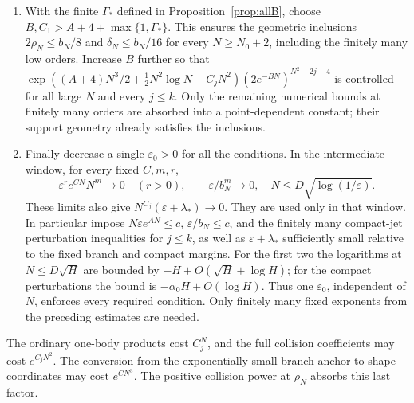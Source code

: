 \documentclass[11pt]{article}
\numberwithin{equation}{section}
\theoremstyle{definition}
\newcommand{\eps}{\varepsilon}
\begin{document}
\begin{enumerate}
the still unselected exponent \(B\).
\item With the finite \(\Gamma_*\) defined in
Proposition~\ref{prop:allB}, choose
\(B,C_1>A+4+\max\{1,\Gamma_*\}\). This ensures the geometric
inclusions \(2\rho_N\le b_N/8\) and \(\delta_N\le b_N/16\)
for every \(N\ge N_0+2\), including the finitely many low orders.
Increase \(B\) further so that
\(\exp((A+4)N^3/2+\tfrac12N^2\log N+C_jN^2)
 (2e^{-BN})^{N^2-2j-4}\) is controlled for all large
\(N\) and every \(j\le k\). Only the remaining numerical bounds
at finitely many orders are absorbed into a point-dependent
constant; their support geometry already satisfies the inclusions.
\item Finally decrease a single \(\eps_0>0\) for all the conditions.
In the intermediate window, for every fixed \(C,m,r\),
\[
 \eps^r e^{CN}N^m\longrightarrow0\quad(r>0),\qquad
 \eps/b_N^m\longrightarrow0,
 \quad N\le D\sqrt{\log(1/\eps)}.
\]
These limits also give \(N^{C_j}(\eps+\lambda_*)\to0\).
They are used only in that window.
In particular impose \(N\eps e^{AN}\le c\),
\(\eps/b_N\le c\), and the finitely many compact-jet
perturbation inequalities for \(j\le k\), as well as
\(\eps+\lambda_*\) sufficiently small relative to the fixed
branch and compact margins. For the first two the logarithms
at \(N\le D\sqrt H\) are bounded by
\(-H+O(\sqrt H+\log H)\); for the compact perturbations the bound
is \(-\alpha_0H+O(\log H)\). Thus one \(\eps_0\), independent
of \(N\), enforces every required condition. Only finitely many
fixed exponents from the preceding estimates are needed.
\end{enumerate}

The ordinary one-body products cost \(C_j^N\), and the full collision
coefficients may cost \(e^{C_jN^2}\). The conversion from the
exponentially small branch anchor to shape coordinates may cost
\(e^{CN^3}\). The positive collision power at \(\rho_N\) absorbs this
last factor.
\end{document}
